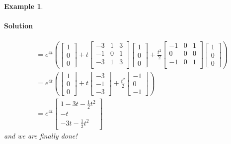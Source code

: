 \documentclass[letterpaper, 11pt, openany]{book}
\theoremstyle{mytheoremstyle}
\theoremstyle{myexamplestyle}
\newtheorem{example}{Example}[section]
\newenvironment{solution}{\paragraph{\sffamily \smaller \fontseries{b}\selectfont Solution}}{\hfill\faSquare}
\begin{document}
\begin{example}
\begin{enumerate}
\begin{solution}
\begin{align*}
                                    &= e^{4t}\left(\begin{bmatrix}1 \\ 0 \\ 0\end{bmatrix} + t \left[
                                        \begin{array}{ccc}
                                            -3 & 1 & 3 \\
                                            -1 & 0 & 1 \\
                                            -3 & 1 & 3 \\
                                           \end{array}
                                        \right] \begin{bmatrix}1 \\ 0 \\ 0\end{bmatrix} + 
                                        \frac{t^2}{2} \left[
                                            \begin{array}{ccc}
                                             -1 & 0 & 1 \\
                                             0 & 0 & 0 \\
                                             -1 & 0 & 1 \\
                                            \end{array}
                                            \right] \begin{bmatrix}1 \\ 0 \\ 0\end{bmatrix}\right)\\
                                    &= e^{4t}\left(\begin{bmatrix}1 \\ 0 \\ 0\end{bmatrix} + t \begin{bmatrix}-3 \\ -1 \\ -3\end{bmatrix} + \frac{t^2}{2} \begin{bmatrix}-1 \\ 0 \\ -1\end{bmatrix}\right)\\
                                    &= e^{4t} \begin{bmatrix} 1 - 3t - \frac{1}{2}t^2 \\ -t \\ -3t - \frac{1}{2}t^2\end{bmatrix}
                \end{align*}
                and we are finally done!\ \faSmile
            \end{solution}
    \end{enumerate}
\end{example}
\end{document}
